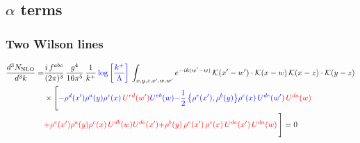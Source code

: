 \documentclass[9pt]{article}
\numberwithin{equation}{section}
\begin{document}
\subsection{$\alpha$ terms}
\subsubsection{Two Wilson lines}
\begin{align}
\frac{d^{3}N_{\rm NLO}}{d^{3}k}= & \frac{i\,f^{abc}}{(2\pi)^{3}}\,\frac{g^{4}}{16\pi^{5}}\,\frac{1}{k^{+}}\,{\color{blue}\log{\left[\frac{k^{+}}{\Lambda}\right]}}\,\int_{x,y,z,x',w,w'}e^{-ik(w'-w)}\,\mathcal{K}(x'-w')\cdot\mathcal{K}(x-w)\,\mathcal{K}(x-z)\cdot\mathcal{K}(y-z)\notag\\
&\times\Bigg[{\color{blue}-\rho^{d}(x') \rho^{a}(y) \rho^{c}(x)\,{\color{red}U^{ed}(w')} U^{e b}(w)}{\color{blue}-\frac{1}{2}\,\big\{\rho^{e}(x'),\rho^{b}(y)\big\}\rho^{c}(x)\,U^{de}(w')\,{\color{red}U^{da}(w)}}\notag \\ & {\color{red}+\rho^{e}(x') \rho^{a}(y) \rho^{c}(x)\, U^{d b}(w) {\color{red}U^{de}(x')}}{\color{red}+\rho^{b}(y)\,\rho^{e}(x')\,\rho^{c}(x)\,U^{de}(x')\,{\color{red}U^{da}(w)}}\,\Bigg] = 0
\end{align}
\end{document}
